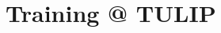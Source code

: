 \documentclass[
 size=14pt,
 paper=smartboard,  %
 mode=present, 		%
 display=slides, 	%
 style=tuliplab,  	%
 pauseslide,
 fleqn,leqno]{powerdot}{}
\newcommand{\draftnote}[3]{
	\todo[author=#2,color=#1!30,size=\footnotesize]{\textsf{#3}}}
\newcommand{\gangli}[1]{\draftnote{blue}{GLi:}{#1}}
\begin{document}
\section{Training @ TULIP}


\end{document}
